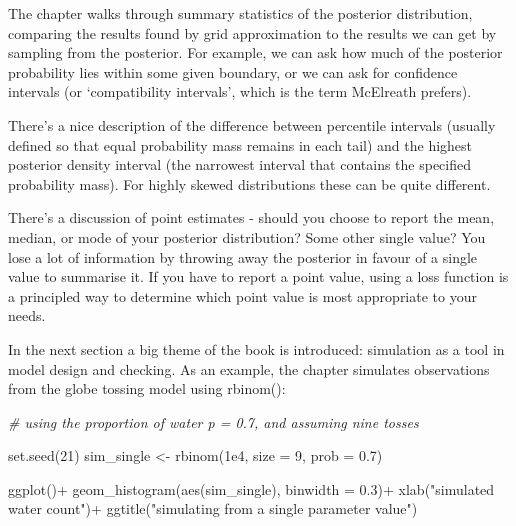\documentclass[
]{book}
\newenvironment{Shaded}{\begin{snugshade}}{\end{snugshade}}
\newcommand{\AttributeTok}[1]{\textcolor[rgb]{0.77,0.63,0.00}{#1}}
\newcommand{\CommentTok}[1]{\textcolor[rgb]{0.56,0.35,0.01}{\textit{#1}}}
\newcommand{\DecValTok}[1]{\textcolor[rgb]{0.00,0.00,0.81}{#1}}
\newcommand{\FloatTok}[1]{\textcolor[rgb]{0.00,0.00,0.81}{#1}}
\newcommand{\FunctionTok}[1]{\textcolor[rgb]{0.00,0.00,0.00}{#1}}
\newcommand{\NormalTok}[1]{#1}
\newcommand{\OtherTok}[1]{\textcolor[rgb]{0.56,0.35,0.01}{#1}}
\newcommand{\SpecialCharTok}[1]{\textcolor[rgb]{0.00,0.00,0.00}{#1}}
\newcommand{\StringTok}[1]{\textcolor[rgb]{0.31,0.60,0.02}{#1}}
\begin{document}
The chapter walks through summary statistics of the posterior distribution, comparing the results found by grid approximation to the results we can get by sampling from the posterior. For example, we can ask how much of the posterior probability lies within some given boundary, or we can ask for confidence intervals (or `compatibility intervals', which is the term McElreath prefers).

There's a nice description of the difference between percentile intervals (usually defined so that equal probability mass remains in each tail) and the highest posterior density interval (the narrowest interval that contains the specified probability mass). For highly skewed distributions these can be quite different.

There's a discussion of point estimates - should you choose to report the mean, median, or mode of your posterior distribution? Some other single value? You lose a lot of information by throwing away the posterior in favour of a single value to summarise it. If you have to report a point value, using a loss function is a principled way to determine which point value is most appropriate to your needs.

In the next section a big theme of the book is introduced: simulation as a tool in model design and checking. As an example, the chapter simulates observations from the globe tossing model using rbinom():

\begin{Shaded}
\begin{Highlighting}[]
\CommentTok{\# using the proportion of water p = 0.7, and assuming nine tosses}

\FunctionTok{set.seed}\NormalTok{(}\DecValTok{21}\NormalTok{)}
\NormalTok{sim\_single }\OtherTok{\textless{}{-}} \FunctionTok{rbinom}\NormalTok{(}\FloatTok{1e4}\NormalTok{, }\AttributeTok{size =} \DecValTok{9}\NormalTok{, }\AttributeTok{prob =} \FloatTok{0.7}\NormalTok{)}

\FunctionTok{ggplot}\NormalTok{()}\SpecialCharTok{+}
  \FunctionTok{geom\_histogram}\NormalTok{(}\FunctionTok{aes}\NormalTok{(sim\_single), }\AttributeTok{binwidth =} \FloatTok{0.3}\NormalTok{)}\SpecialCharTok{+}
  \FunctionTok{xlab}\NormalTok{(}\StringTok{"simulated water count"}\NormalTok{)}\SpecialCharTok{+}
  \FunctionTok{ggtitle}\NormalTok{(}\StringTok{"simulating from a single parameter value"}\NormalTok{)}
\end{Highlighting}
\end{Shaded}
\end{document}
